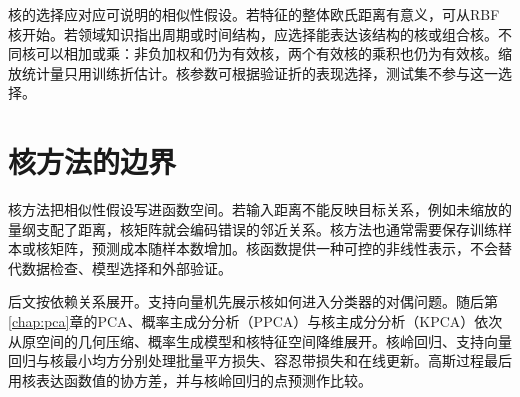 核的选择应对应可说明的相似性假设。若特征的整体欧氏距离有意义，可从RBF核开始。若领域知识指出周期或时间结构，应选择能表达该结构的核或组合核。不同核可以相加或乘：非负加权和仍为有效核，两个有效核的乘积也仍为有效核。缩放统计量只用训练折估计。核参数可根据验证折的表现选择，测试集不参与这一选择。

\section{核方法的边界}
核方法把相似性假设写进函数空间。若输入距离不能反映目标关系，例如未缩放的量纲支配了距离，核矩阵就会编码错误的邻近关系。核方法也通常需要保存训练样本或核矩阵，预测成本随样本数增加。核函数提供一种可控的非线性表示，不会替代数据检查、模型选择和外部验证。

后文按依赖关系展开。支持向量机先展示核如何进入分类器的对偶问题。随后第\ref{chap:pca}章的PCA、概率主成分分析（PPCA）与核主成分分析（KPCA）依次从原空间的几何压缩、概率生成模型和核特征空间降维展开。核岭回归、支持向量回归与核最小均方分别处理批量平方损失、容忍带损失和在线更新。高斯过程最后用核表达函数值的协方差，并与核岭回归的点预测作比较。
